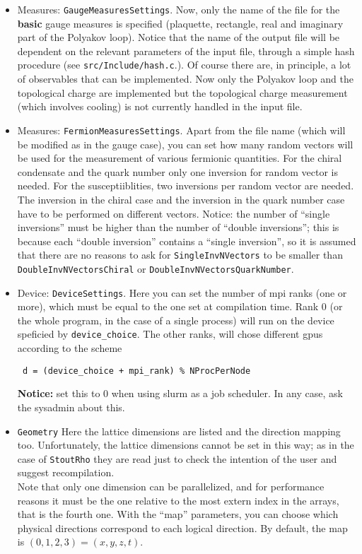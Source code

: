 \begin{itemize}
\item{Measures: \verb|GaugeMeasuresSettings|.} Now, only the name of the file
for the {\bfseries basic} gauge measures is specified (plaquette, rectangle, real and imaginary part of the Polyakov loop). Notice that the name of the output 
file will be dependent on the relevant parameters of the input file, through a
simple hash procedure (see \verb|src/Include/hash.c|.). Of course there are, in principle, a lot of observables that can be implemented. Now only the Polyakov
loop and the topological charge are implemented but the topological charge 
measurement (which involves cooling) is not currently handled in the input file. 
\item{Measures: \verb|FermionMeasuresSettings|.}
 Apart from the file name (which will be modified as in the gauge case),   
you can set how many random vectors will be used for the measurement of various 
fermionic quantities. For the chiral condensate and the quark number only one 
inversion for random vector is needed. For the susceptiiblities, two inversions 
per random vector are needed. The inversion in the chiral case and the inversion 
in the quark number case have to be performed on different vectors. Notice: the 
number of ``single inversions'' must be higher than the number of ``double 
inversions''; this is because each ``double inversion'' 
contains a ``single inversion'', so it is assumed that there are no reasons to 
ask for \verb|SingleInvNVectors| to be smaller than \verb|DoubleInvNVectorsChiral|
or \verb|DoubleInvNVectorsQuarkNumber|.
    
\item{Device: \verb|DeviceSettings|.}  Here you can set the number of 
mpi ranks (one or more), which must be equal to  the one set at compilation 
time. Rank 0 (or the whole program, in the case of a single process) will run 
on the device speficied by \verb|device_choice|. The other ranks, will chose 
different gpus according to the scheme
\begin{verbatim}
 d = (device_choice + mpi_rank) % NProcPerNode
\end{verbatim}
\textbf{Notice: } set this to 0 when using slurm as a job scheduler. In any 
case, ask the sysadmin about this.\\


\item{\verb|Geometry|} Here the lattice dimensions are listed and the 
direction mapping too. Unfortunately, the lattice dimensions cannot be set in 
this way; as in the case of \verb|StoutRho| they are read just to check the 
intention of the user and suggest recompilation. \\
Note that only one dimension can be parallelized, and for performance 
reasons it must be the one relative to the most extern index in the arrays, 
that is the fourth one. With the ``map'' parameters, you can choose which 
physical directions correspond to each logical direction. By default, 
the map is $(0,1,2,3) = (x,y,z,t)$.


\end{itemize}
